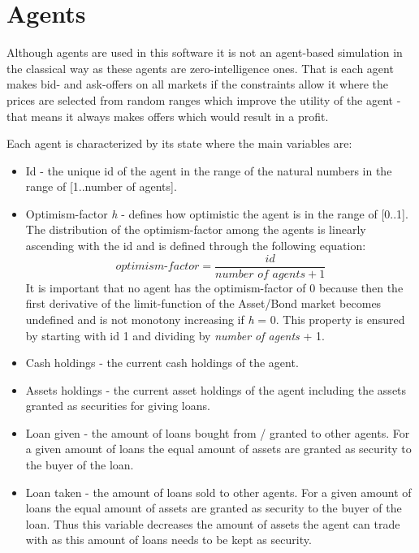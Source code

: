\documentclass[Bachelorarbeit.tex]{subfiles}
\begin{document}
\section{Agents}
\label{sec:AGENTS}
Although agents are used in this software it is not an agent-based simulation in the classical way as these agents are zero-intelligence ones. That is each agent makes bid- and ask-offers on all markets if the constraints allow it where the prices are selected from random ranges which improve the utility of the agent - that means it always makes offers which would result in a profit.

\medskip

Each agent is characterized by its state where the main variables are:

\begin{itemize}
\item Id - the unique id of the agent in the range of the natural numbers in the range of [1..number of agents].
\item Optimism-factor \textit{h} - defines how optimistic the agent is in the range of [0..1]. The distribution of the optimism-factor among the agents is linearly ascending with the id and is defined through the following equation: 
\begin{equation}
\textit{optimism-factor} = \frac{id}{\textit{number of agents} + 1}
\end{equation}
It is important that no agent has the optimism-factor of 0 because then the first derivative of the limit-function of the Asset/Bond market becomes undefined and is not monotony increasing if \textit{h} = 0. This property is ensured by starting with id 1 and dividing by \textit{number of agents} + 1.
\item Cash holdings - the current cash holdings of the agent.
\item Assets holdings - the current asset holdings of the agent including the assets granted as securities for giving loans.
\item Loan given - the amount of loans bought from / granted to other agents. For a given amount of loans the equal amount of assets are granted as security to the buyer of the loan.
\item Loan taken - the amount of loans sold to other agents. For a given amount of loans the equal amount of assets are granted as security to the buyer of the loan. Thus this variable decreases the amount of assets the agent can trade with as this amount of loans needs to be kept as security.
\end{itemize}
\end{document}
